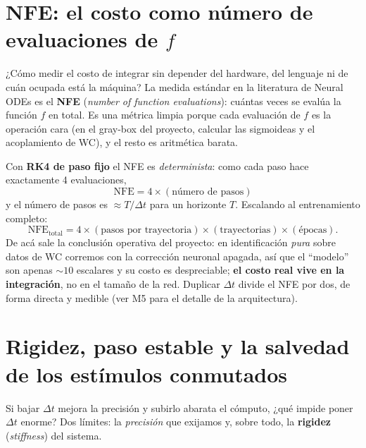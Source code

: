 \documentclass[11pt,a4paper]{article}
\begin{document}
\section{NFE: el costo como número de evaluaciones de \texorpdfstring{$f$}{f}}
\label{sec:nfe}
¿Cómo medir el costo de integrar sin depender del hardware, del lenguaje ni de cuán ocupada está la máquina? La medida estándar en la literatura de Neural ODEs \cite{chen2018} es el \textbf{NFE} (\emph{number of function evaluations}): cuántas veces se evalúa la función $f$ en total. Es una métrica limpia porque cada evaluación de $f$ es la operación cara (en el gray-box del proyecto, calcular las sigmoideas y el acoplamiento de WC), y el resto es aritmética barata.

Con \textbf{RK4 de paso fijo} el NFE es \emph{determinista}: como cada paso hace exactamente 4 evaluaciones,
\begin{equation}
  \boxed{\ \mathrm{NFE}=4\times(\text{n\'umero de pasos})\ }
\label{eq:nfe}
\end{equation}
y el número de pasos es $\approx T/\Delta t$ para un horizonte $T$. Escalando al entrenamiento completo:
\begin{equation}
  \mathrm{NFE}_{\text{total}}=4\times(\text{pasos por trayectoria})\times(\text{trayectorias})\times(\text{\'epocas}).
\end{equation}
De acá sale la conclusión operativa del proyecto: en identificación \emph{pura} sobre datos de WC corremos con la corrección neuronal apagada, así que el ``modelo'' son apenas $\sim\!10$ escalares y su costo es despreciable; \textbf{el costo real vive en la integración}, no en el tamaño de la red. Duplicar $\Delta t$ divide el NFE por dos, de forma directa y medible (ver M5 para el detalle de la arquitectura).

\section{Rigidez, paso estable y la salvedad de los estímulos conmutados}
\label{sec:rigidez}
Si bajar $\Delta t$ mejora la precisión y subirlo abarata el cómputo, ¿qué impide poner $\Delta t$ enorme? Dos límites: la \emph{precisión} que exijamos y, sobre todo, la \textbf{rigidez} (\emph{stiffness}) del sistema.
\end{document}
